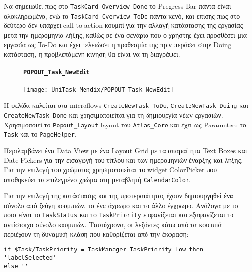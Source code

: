                 Να σημειωθεί πως στο \texttt{TaskCard\_Overview\_Done} το Progress Bar πάντα είναι ολοκληρωμένο, ενώ το \texttt{TaskCard\_Overview\_ToDo} πάντα κενό, και επίσης πως στο δεύτερο δεν υπάρχει call-to-action κουμπί για την αλλαγή κατάστασης της εργασίας μετά την ημερομηνία λήξης, καθώς σε ένα σενάριο που ο χρήστης έχει προσθέσει μια εργασία ως To-Do και έχει τελειώσει η προθεσμία της πριν περάσει στην Doing κατάσταση, η προβλεπόμενη κίνηση θα είναι να τη διαγράψει.

                \begin{figure}[H] \noindent
                    \paragraph{\texttt{POPOUT\_Task\_NewEdit}}
                    \begin{center}
                        \texttt{[image: UniTask\_Mendix/POPOUT\_Task\_NewEdit]}
                    \end{center}
                \end{figure}

                Η σελίδα καλείται στα microflows \texttt{CreateNewTask\_ToDo}, \texttt{CreateNewTask\_Doing} και \texttt{CreateNewTask\_Done} και χρησιμοποιείται για τη δημιουργία νέων εργασιών. Χρησιμοποιεί το \texttt{Popout\_Layout} layout του \texttt{Atlas\_Core} και έχει ως Parameters το \texttt{Task} και το \texttt{PageHelper}.

                Περιλαμβάνει ένα Data View με ένα Layout Grid με τα απαραίτητα Text Boxes και Date Pickers για την εισαγωγή του τίτλου και των ημερομηνιών έναρξης και λήξης. Για την επιλογή του χρώματος χρησιμοποιείται το widget ColorPicker που αποθηκεύει το επιλεγμένο χρώμα στη μεταβλητή \texttt{CalendarColor}.

                Για την επιλογή της κατάστασης και της προτεραιότητας έχουν δημιουργηθεί ένα σύνολο από ζεύγη κουμπιών, το ένα άχρωμο και το άλλο έγχρωμο. Ανάλογα με το ποιο είναι το \texttt{TaskStatus} και το \texttt{TaskPriority} εμφανίζεται και εξαφανίζεται το αντίστοιχο σύνολο κουμπιών. Ταυτόχρονα, οι λεζάντες κάτω από τα κουμπιά περιέχουν τη δυναμική κλάση που καθορίζεται από την έκφραση:

                \begin{lstlisting}[mystyle]
if $Task/TaskPriority = TaskManager.TaskPriority.Low then 'labelSelected'
else ''         \end{lstlisting}

